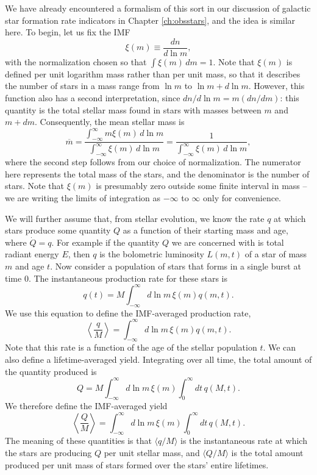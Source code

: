 We have already encountered a formalism of this sort in our discussion of galactic star formation rate indicators in Chapter \ref{ch:obsstars}, and the idea is similar here. To begin, let us fix the IMF
\begin{equation}
\xi(m) \equiv \frac{dn}{d\ln m},
\end{equation}
with the normalization chosen so that $\int \xi(m) \, dm = 1$. Note that $\xi(m)$ is defined per unit logarithm mass rather than per unit mass, so that it describes the number of stars in a mass range from $\ln m$ to $\ln m + d\ln m$. However, this function also has a second interpretation, since $dn/d\ln m = m (dn/dm)$: this quantity is the total stellar mass found in stars with masses between $m$ and $m+dm$. Consequently, the mean stellar mass is
\begin{equation}
\overline{m} = \frac{\int_{-\infty}^\infty m \xi(m) \, d\ln m}{\int_{-\infty}^\infty \xi(m) \, d\ln m} = \frac{1}{\int_{-\infty}^\infty \xi(m) \, d\ln m},
\end{equation}
where the second step follows from our choice of normalization. The numerator here represents the total mass of the stars, and the denominator is the number of stars. Note that $\xi(m)$ is presumably zero outside some finite interval in mass -- we are writing the limits of integration as $-\infty$ to $\infty$ only for convenience.

We will further assume that, from stellar evolution, we know the rate $q$ at which stars produce some quantity $Q$ as a function of their starting mass and age, where $\dot{Q} = q$. For example if the quantity $Q$ we are concerned with is total radiant energy $E$, then $q$ is the bolometric luminosity $L(m,t)$ of a star of mass $m$ and age $t$. Now consider a population of stars that forms in a single burst at time 0. The instantaneous production rate for these stars is
\begin{equation}
q(t) = M \int_{-\infty}^{\infty} d\ln m \, \xi(m) q(m,t).
\end{equation}
We use this equation to define the IMF-averaged production rate,
\begin{equation}
\left\langle \frac{q}{M}\right\rangle = \int_{-\infty}^{\infty} d\ln m \, \xi(m) q(m,t).
\end{equation}
Note that this rate is a function of the age of the stellar population $t$. We can also define a lifetime-averaged yield. Integrating over all time, the total amount of the quantity produced is
\begin{equation}
Q = M \int_{-\infty}^{\infty} d\ln m \, \xi(m) \int_0^\infty dt\, q(M,t).
\end{equation}
We therefore define the IMF-averaged yield
\begin{equation}
\left\langle \frac{Q}{M} \right\rangle = \int_{-\infty}^{\infty} d\ln m \, \xi(m) \int_0^\infty dt\, q(M,t).
\end{equation}
The meaning of these quantities is that $\langle q/M\rangle$ is the instantaneous rate at which the stars are producing $Q$ per unit stellar mass, and $\langle Q/M\rangle$ is the total amount produced per unit mass of stars formed over the stars' entire lifetimes.

